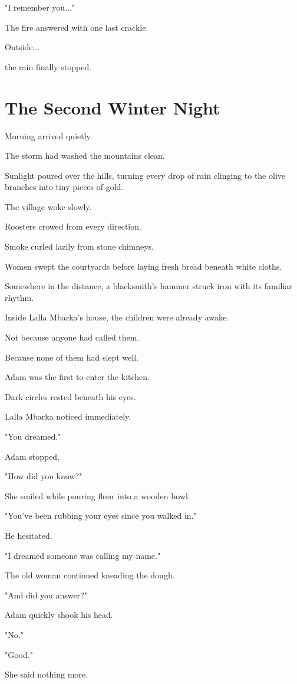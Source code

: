 \documentclass[12pt,openany]{book}
\begin{document}
"I remember you..."

The fire answered with one last crackle.

Outside...

the rain finally stopped.
\chapter{The Second Winter Night}

Morning arrived quietly.

The storm had washed the mountains clean.

Sunlight poured over the hills, turning every drop of rain clinging to the olive branches into tiny pieces of gold.

The village woke slowly.

Roosters crowed from every direction.

Smoke curled lazily from stone chimneys.

Women swept the courtyards before laying fresh bread beneath white cloths.

Somewhere in the distance, a blacksmith's hammer struck iron with its familiar rhythm.

Inside Lalla Mbarka's house, the children were already awake.

Not because anyone had called them.

Because none of them had slept well.

Adam was the first to enter the kitchen.

Dark circles rested beneath his eyes.

Lalla Mbarka noticed immediately.

"You dreamed."

Adam stopped.

"How did you know?"

She smiled while pouring flour into a wooden bowl.

"You've been rubbing your eyes since you walked in."

He hesitated.

"I dreamed someone was calling my name."

The old woman continued kneading the dough.

"And did you answer?"

Adam quickly shook his head.

"No."

"Good."

She said nothing more.
\end{document}
